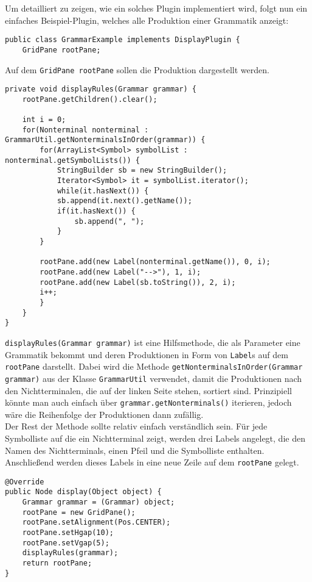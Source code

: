 Um detailliert zu zeigen, wie ein solches Plugin implementiert wird, folgt nun ein einfaches Beispiel-Plugin, welches alle Produktion einer Grammatik anzeigt:
\begin{lstlisting}[frame=single, basicstyle=\small, caption=Der Kopf der Klasse \textit{GrammarExample}]
public class GrammarExample implements DisplayPlugin {
	GridPane rootPane;
\end{lstlisting}
Auf dem \lstinline[columns=fixed]{GridPane rootPane} sollen die Produktion dargestellt werden.
\begin{lstlisting}[frame=single, basicstyle=\small, caption=Die Methode \textit{displayRules}]
private void displayRules(Grammar grammar) {
	rootPane.getChildren().clear();
	
	int i = 0;
	for(Nonterminal nonterminal : GrammarUtil.getNonterminalsInOrder(grammar)) {
		for(ArrayList<Symbol> symbolList : nonterminal.getSymbolLists()) {
			StringBuilder sb = new StringBuilder();
			Iterator<Symbol> it = symbolList.iterator();
			while(it.hasNext()) {
			sb.append(it.next().getName());
			if(it.hasNext()) {
				sb.append(", ");
			}
		}
		
		rootPane.add(new Label(nonterminal.getName()), 0, i);
		rootPane.add(new Label("-->"), 1, i);
		rootPane.add(new Label(sb.toString()), 2, i);
		i++;
		}
	}
}
\end{lstlisting}
\lstinline[columns=fixed]{displayRules(Grammar grammar)} ist eine Hilfsmethode, die als Parameter eine Grammatik bekommt und deren Produktionen in Form von \lstinline[columns=fixed]{Label}s auf dem \lstinline[columns=fixed]{rootPane} darstellt. Dabei wird die Methode \lstinline[columns=fixed]{getNonterminalsInOrder(Grammar grammar)} aus der Klasse \lstinline[columns=fixed]{GrammarUtil} verwendet, damit die Produktionen nach den Nichtterminalen, die auf der linken Seite stehen, sortiert sind. Prinzipiell könnte man auch einfach über \lstinline[columns=fixed]{grammar.getNonterminals()} iterieren, jedoch wäre die Reihenfolge der Produktionen dann zufällig.\\
Der Rest der Methode sollte relativ einfach verständlich sein. Für jede Symbolliste auf die ein Nichtterminal zeigt, werden drei Labels angelegt, die den Namen des Nichtterminals, einen Pfeil und die Symbolliste enthalten. Anschließend werden dieses Labels in eine neue Zeile auf dem \lstinline[columns=fixed]{rootPane} gelegt.
\begin{lstlisting}[frame=single, basicstyle=\small, caption=Die Methode \textit{display}]
@Override
public Node display(Object object) {
	Grammar grammar = (Grammar) object;
	rootPane = new GridPane();
	rootPane.setAlignment(Pos.CENTER);
	rootPane.setHgap(10);
	rootPane.setVgap(5);
	displayRules(grammar);
	return rootPane;
}
\end{lstlisting}
